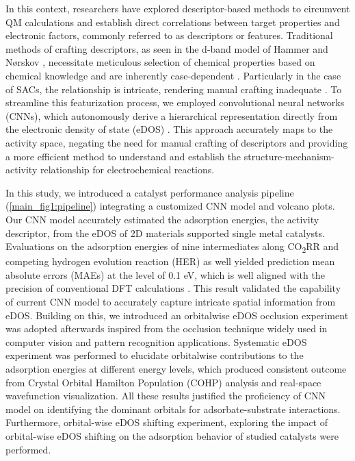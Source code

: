 In this context, researchers have explored descriptor-based methods
to circumvent QM calculations and establish direct correlations
between target properties and electronic factors, commonly referred to as descriptors or features.
Traditional methods of crafting descriptors, as seen in the d-band model of Hammer and Nørskov \cite{hammer1995electronic},
necessitate meticulous selection of chemical properties based on chemical knowledge
and are inherently case-dependent \cite{kajita2017universal}.
Particularly in the case of SACs, the relationship is intricate,
rendering manual crafting inadequate \cite{han2021single, thirumalai2018investigating}.
To streamline this featurization process, we employed convolutional neural networks (CNNs),
which autonomously derive a hierarchical representation directly from the electronic density of state (eDOS)
\cite{tran2015learning, socher2012convolutional, krizhevsky2012imagenet}.
This approach accurately maps to the activity space, negating the need for manual crafting of descriptors
and providing a more efficient method to understand and
establish the structure-mechanism-activity relationship for electrochemical reactions.

In this study, we introduced a catalyst performance analysis pipeline (\cref{main_fig1:pipeline})
integrating a customized CNN model and volcano plots.
Our CNN model accurately estimated the adsorption energies, the activity descriptor,
from the eDOS of 2D materials supported single metal catalysts.
Evaluations on the adsorption energies of nine intermediates along CO\textsubscript{2}RR
and competing hydrogen evolution reaction (HER) as well
yielded prediction mean absolute errors (MAEs) at the level of 0.1 eV,
which is well aligned with the precision of conventional DFT calculations
\cite{kirklin2015open, lejaeghere2016reproducibility, wellendorff2015benchmark}.
This result validated the capability of current CNN model to accurately capture intricate spatial information from eDOS.
Building on this, we introduced an orbitalwise eDOS occlusion experiment was adopted afterwards
inspired from the occlusion technique widely used in computer vision and pattern recognition applications.
Systematic eDOS experiment was performed to elucidate orbitalwise contributions to
the adsorption energies at different energy levels,
which produced consistent outcome from Crystal Orbital Hamilton Population (COHP) analysis
and real-space wavefunction visualization.
All these results justified the proficiency of CNN model on identifying
the dominant orbitals for adsorbate-substrate interactions.
Furthermore, orbital-wise eDOS shifting experiment, exploring the impact of orbital-wise eDOS shifting
on the adsorption behavior of studied catalysts were performed.

